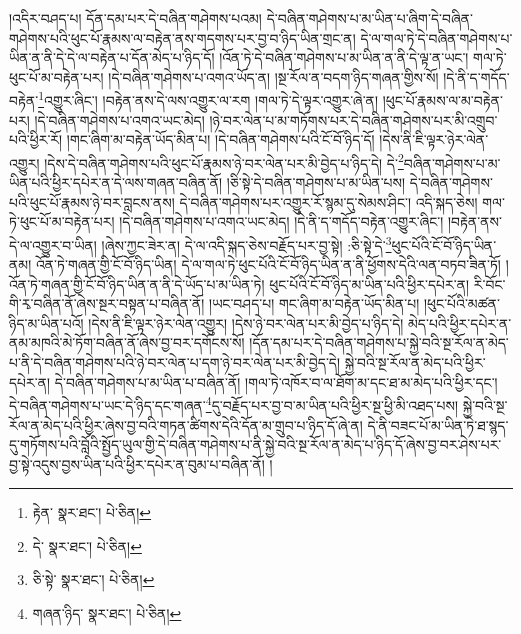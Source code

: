 །འདིར་བཤད་པ། དོན་དམ་པར་དེ་བཞིན་གཤེགས་པའམ། དེ་བཞིན་གཤེགས་པ་མ་ཡིན་པ་ཞིག་དེ་བཞིན་གཤེགས་པའི་ཕུང་པོ་རྣམས་ལ་བརྟེན་ནས་གདགས་པར་བྱ་བ་ཉིད་ཡིན་གྲང་ན། དེ་ལ་གལ་ཏེ་དེ་བཞིན་གཤེགས་པ་ཡིན་ན་ནི་དེ་དེ་ལ་བརྟེན་པ་དོན་མེད་པ་ཉིད་དོ། །འོན་ཏེ་དེ་བཞིན་གཤེགས་པ་མ་ཡིན་ན་ནི་དེ་ལྟ་ན་ཡང་། གལ་ཏེ་ཕུང་པོ་མ་བརྟེན་པར། །དེ་བཞིན་གཤེགས་པ་འགའ་ཡོད་ན། །སྔ་རོལ་ན་བདག་ཉིད་གཞན་གྱིས་སོ། །དེ་ནི་ད་གདོད་བརྟེན་\footnote{རྟེན་  སྣར་ཐང་།  པེ་ཅིན། }འགྱུར་ཞིང་། །བརྟེན་ནས་དེ་ལས་འགྱུར་ལ་རག །གལ་ཏེ་དེ་ལྟར་འགྱུར་ཞེ་ན། །ཕུང་པོ་རྣམས་ལ་མ་བརྟེན་པར། །དེ་བཞིན་གཤེགས་པ་འགའ་ཡང་མེད། །ཉེ་བར་ལེན་པ་མ་གཏོགས་པར་དེ་བཞིན་གཤེགས་པར་མི་འགྲུབ་པའི་ཕྱིར་རོ། །གང་ཞིག་མ་བརྟེན་ཡོད་མིན་པ། །དེ་བཞིན་གཤེགས་པའི་ངོ་བོ་ཉིད་དོ། །དེས་ནི་ཇི་ལྟར་ཉེར་ལེན་འགྱུར། །དེས་དེ་བཞིན་གཤེགས་པའི་ཕུང་པོ་རྣམས་ཉེ་བར་ལེན་པར་མི་བྱེད་པ་ཉིད་དེ། དེ་\footnote{དེ་  སྣར་ཐང་།  པེ་ཅིན། }བཞིན་གཤེགས་པ་མ་ཡིན་པའི་ཕྱིར་དཔེར་ན་དེ་ལས་གཞན་བཞིན་ནོ། །ཅི་སྟེ་དེ་བཞིན་གཤེགས་པ་མ་ཡིན་པས། དེ་བཞིན་གཤེགས་པའི་ཕུང་པོ་རྣམས་ཉེ་བར་བླངས་ནས། དེ་བཞིན་གཤེགས་པར་འགྱུར་རོ་སྙམ་དུ་སེམས་ཤིང་། འདི་སྐད་ཅེས། གལ་ཏེ་ཕུང་པོ་མ་བརྟེན་པར། །དེ་བཞིན་གཤེགས་པ་འགའ་ཡང་མེད། །དེ་ནི་ད་གདོད་བརྟེན་འགྱུར་ཞིང་། །བརྟེན་ནས་དེ་ལ་འགྱུར་བ་ཡིན། །ཞེས་ཀྱང་ཟེར་ན། དེ་ལ་འདི་སྐད་ཅེས་བརྗོད་པར་བྱ་སྟེ། :ཅི་སྟེ་དེ་\footnote{ཅི་སྟེ་  སྣར་ཐང་།  པེ་ཅིན། }ཕུང་པོའི་ངོ་བོ་ཉིད་ཡིན་ནམ། འོན་ཏེ་གཞན་གྱི་ངོ་བོ་ཉིད་ཡིན། དེ་ལ་གལ་ཏེ་ཕུང་པོའི་ངོ་བོ་ཉིད་ཡིན་ན་ནི་ཕྱོགས་དེའི་ལན་བཏབ་ཟིན་ཏོ། །འོན་ཏེ་གཞན་གྱི་ངོ་བོ་ཉིད་ཡིན་ན་ནི་དེ་ཡོད་པ་མ་ཡིན་ཏེ། ཕུང་པོའི་ངོ་བོ་ཉིད་མ་ཡིན་པའི་ཕྱིར་དཔེར་ན། རི་བོང་གི་རྭ་བཞིན་ནོ་ཞེས་སྔར་བསྟན་པ་བཞིན་ནོ། །ཡང་བཤད་པ། གང་ཞིག་མ་བརྟེན་ཡོད་མིན་པ། །ཕུང་པོའི་མཚན་ཉིད་མ་ཡིན་པའོ། །དེས་ནི་ཇི་ལྟར་ཉེར་ལེན་འགྱུར། །དེས་ཉེ་བར་ལེན་པར་མི་བྱེད་པ་ཉིད་དེ། མེད་པའི་ཕྱིར་དཔེར་ན་ནམ་མཁའི་མེ་ཏོག་བཞིན་ནོ་ཞེས་བྱ་བར་དགོངས་སོ། །དོན་དམ་པར་དེ་བཞིན་གཤེགས་པ་སྐྱེ་བའི་སྔ་རོལ་ན་མེད་པ་ནི་དེ་བཞིན་གཤེགས་པའི་ཉེ་བར་ལེན་པ་དག་ཉེ་བར་ལེན་པར་མི་བྱེད་དེ། སྐྱེ་བའི་སྔ་རོལ་ན་མེད་པའི་ཕྱིར་དཔེར་ན། དེ་བཞིན་གཤེགས་པ་མ་ཡིན་པ་བཞིན་ནོ། །གལ་ཏེ་འཁོར་བ་ལ་ཐོག་མ་དང་ཐ་མ་མེད་པའི་ཕྱིར་དང་། དེ་བཞིན་གཤེགས་པ་ཡང་དེ་ཉིད་དང་གཞན་\footnote{གཞན་ཉིད་  སྣར་ཐང་།  པེ་ཅིན། }དུ་བརྗོད་པར་བྱ་བ་མ་ཡིན་པའི་ཕྱིར་སྔ་ཕྱི་མི་འཐད་པས། སྐྱེ་བའི་སྔ་རོལ་ན་མེད་པའི་ཕྱིར་ཞེས་བྱ་བའི་གཏན་ཚིགས་དེའི་དོན་མ་གྲུབ་པ་ཉིད་དོ་ཞེ་ན། དེ་ནི་བཟང་པོ་མ་ཡིན་ཏེ་ཐ་སྙད་དུ་གཏོགས་པའི་བློའི་སྤྱོད་ཡུལ་གྱི་དེ་བཞིན་གཤེགས་པ་ནི་སྐྱེ་བའི་སྔ་རོལ་ན་མེད་པ་ཉིད་དོ་ཞེས་བྱ་བར་ཤེས་པར་བྱ་སྟེ་འདུས་བྱས་ཡིན་པའི་ཕྱིར་དཔེར་ན་བུམ་པ་བཞིན་ནོ། །
